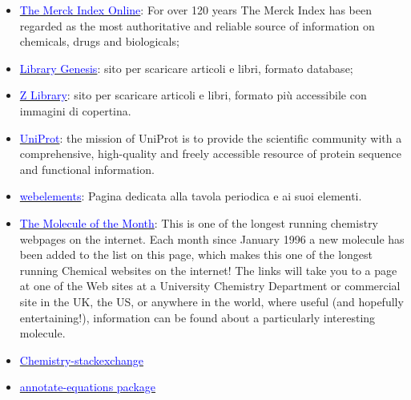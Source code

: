 \begin{footnotesize}
\begin{multicols}{2}
\begin{itemize}
    \item \href{https://www.rsc.org/merck-index}{\textcolor{blue}{The Merck Index Online}}: For over 120 years The Merck Index has been regarded as the most authoritative and reliable source of information on chemicals, drugs and biologicals;
    \item \href{http://libgen.is/}{\textcolor{blue}{Library Genesis}}: sito per scaricare articoli e libri, formato database;
    \item \href{https://it.z-lib.org/}{\textcolor{blue}{Z Library}}: sito per scaricare articoli e libri, formato più accessibile con immagini di copertina.
    \item \href{https://www.uniprot.org/}{\textcolor{blue}{UniProt}}: the mission of UniProt is to provide the scientific community with a comprehensive, high-quality and freely accessible resource of protein sequence and functional information.
    \item \href{https://www.webelements.com/}{\textcolor{blue}{webelements}}: Pagina dedicata alla tavola periodica e ai suoi elementi.
    \item  \href{http://www.chm.bris.ac.uk/motm/motm.htm}{\textcolor{blue}{The Molecule of the Month}}: This is one of the longest running chemistry webpages on the internet. Each month since January 1996 a new molecule has been added to the list on this page, which makes this one of the longest running Chemical websites on the internet! The links will take you to a page at one of the Web sites at a University Chemistry Department or commercial site in the UK, the US, or anywhere in the world, where useful (and hopefully entertaining!), information can be found about a particularly interesting molecule.
    \item \href{https://chemistry.stackexchange.com/}{\textcolor{blue}{Chemistry-stackexchange}}
    \item \href{https://ctan.org/pkg/annotate-equations}{\textcolor{blue}{annotate-equations package}}
\end{itemize}
\end{multicols}
\end{footnotesize}

